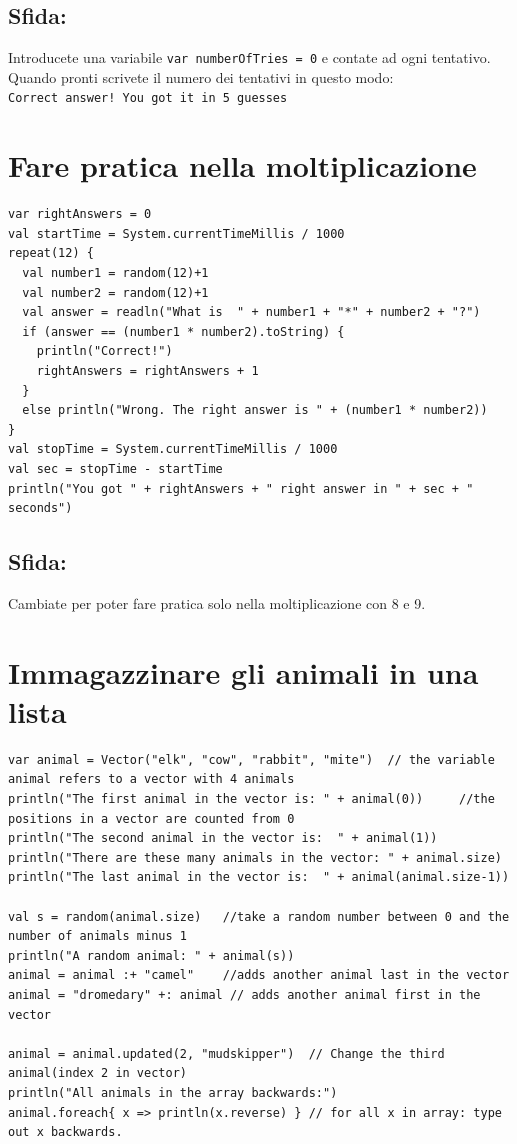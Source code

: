 \section*{\color{BrickRed}Sfida:}
Introducete una variabile \lstinline{var numberOfTries = 0} e contate ad ogni tentativo.\\
Quando pronti scrivete il numero dei tentativi in questo modo:\\
\lstinline{Correct answer! You got it in 5 guesses}
\chapter{Fare pratica nella moltiplicazione}
\begin{lstlisting}[basicstyle={\ttfamily\fontsize{16}{19}\selectfont},numbers=none]
var rightAnswers = 0
val startTime = System.currentTimeMillis / 1000
repeat(12) {
  val number1 = random(12)+1
  val number2 = random(12)+1
  val answer = readln("What is  " + number1 + "*" + number2 + "?")
  if (answer == (number1 * number2).toString) {
    println("Correct!")
    rightAnswers = rightAnswers + 1
  }
  else println("Wrong. The right answer is " + (number1 * number2))
}
val stopTime = System.currentTimeMillis / 1000
val sec = stopTime - startTime
println("You got " + rightAnswers + " right answer in " + sec + " seconds")
\end{lstlisting}
        
\section*{\color{BrickRed}Sfida:}
Cambiate per poter fare pratica solo nella moltiplicazione con 8 e 9.
\chapter{Immagazzinare gli animali in una lista}
\begin{lstlisting}[basicstyle={\ttfamily\fontsize{14}{17}\selectfont},numbers=none]
var animal = Vector("elk", "cow", "rabbit", "mite")  // the variable animal refers to a vector with 4 animals
println("The first animal in the vector is: " + animal(0))     //the positions in a vector are counted from 0
println("The second animal in the vector is:  " + animal(1))
println("There are these many animals in the vector: " + animal.size)
println("The last animal in the vector is:  " + animal(animal.size-1))

val s = random(animal.size)   //take a random number between 0 and the number of animals minus 1
println("A random animal: " + animal(s))
animal = animal :+ "camel"    //adds another animal last in the vector
animal = "dromedary" +: animal // adds another animal first in the vector

animal = animal.updated(2, "mudskipper")  // Change the third animal(index 2 in vector)
println("All animals in the array backwards:")
animal.foreach{ x => println(x.reverse) } // for all x in array: type out x backwards.
\end{lstlisting}
        
